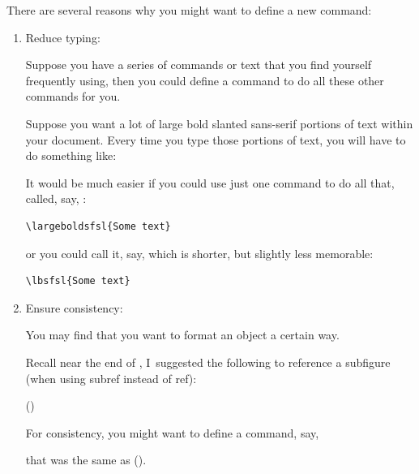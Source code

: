 There are several reasons why you might want to define
a new command:
\begin{enumerate}

\item Reduce typing:

Suppose you have a series of commands or text that
you find yourself frequently using, then you could define
a command to do all these other commands for you.


Suppose you want a lot of large bold slanted sans-serif
portions of text within your document.  Every time you type those
portions of text, you will have to do something like:
\begin{codeS}
\end{codeS}%
It would be much easier if you could use just one command
to do all that, called, say, :
\begin{codeS}
\begin{verbatim}
\largeboldsfsl{Some text}
\end{verbatim}
\end{codeS}%
or you could call it, say,  which is shorter,
but slightly less memorable:
\begin{codeS}
\begin{verbatim}
\lbsfsl{Some text}
\end{verbatim}
\end{codeS}

\item Ensure consistency:

You may find that you want to format an object a certain
way.


Recall near the end of , I~suggested the
following to reference a subfigure (when using \gls{subref} instead
of \gls{ref}):
\begin{codeS}
()
\end{codeS}
For consistency, you might want to define a command, say,
\begin{alltt}
\end{alltt}
that was the same as 
().



\end{enumerate}
